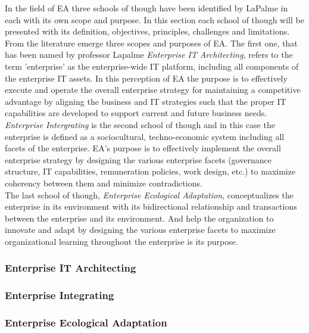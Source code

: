 In the field of EA three schools of though have been identified by LaPalme in \citep{lapalme2012} each with its own scope and purpose. In this section each school of though will be presented with its definition, objectives, principles, challenges and limitations. \\
From the literature emerge three scopes and purposes of EA. The first one, that has been named by professor Lapalme \textit{Enterprise IT Architecting}, refers to the term 'enterprise' as the enterprise-wide IT platform, including all components of the enterprise IT assets. In this perception of EA the purpose is to effectively execute and operate the overall enterprise strategy for maintaining a competitive advantage by aligning the business and IT strategies such that the proper IT capabilities are developed to support current and future business needs. \\
\textit{Enterprise Intergrating} is the second school of though and in this case the enterprise is defined as a sociocultural, techno-economic system including all facets of the enterprise. EA's purpose is to effectively implement the overall enterprise strategy by designing the various enterprise facets (governance structure, IT capabilities, remuneration policies, work design, etc.) to maximize coherency between them and minimize contradictions. \\
The last school of though, \textit{Enterprise Ecological Adaptation}, conceptualizes the enterprise in its environment with its bidirectional relationship and transactions between the enterprise and its environment. And help the organization to innovate and adapt by designing the various enterprise facets to maximize organizational learning throughout the enterprise is its purpose. \\

\subsubsection*{Enterprise IT Architecting}

\subsubsection*{Enterprise Integrating}

\subsubsection*{Enterprise Ecological Adaptation}

